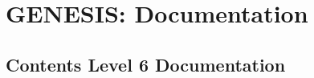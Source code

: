 \documentclass[12pt]{article}
\begin{document}
\section*{GENESIS: Documentation}

\subsection*{Contents Level 6 Documentation}

\end{document}
